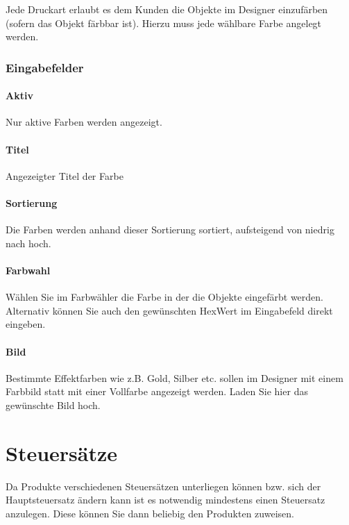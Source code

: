 \documentclass[letterpaper,10pt,ngerman]{sphinxmanual}
\begin{document}
Jede Druckart erlaubt es dem Kunden die Objekte im Designer einzufärben (sofern das Objekt färbbar ist).
Hierzu muss jede wählbare Farbe angelegt werden.


\subsubsection{Eingabefelder}
\label{\detokenize{hbe/printtypes:id1}}

\paragraph{Aktiv}
\label{\detokenize{hbe/printtypes:id2}}
Nur aktive Farben werden angezeigt.


\paragraph{Titel}
\label{\detokenize{hbe/printtypes:id3}}
Angezeigter Titel der Farbe


\paragraph{Sortierung}
\label{\detokenize{hbe/printtypes:id4}}
Die Farben werden anhand dieser Sortierung sortiert, aufsteigend von niedrig nach hoch.


\paragraph{Farbwahl}
\label{\detokenize{hbe/printtypes:farbwahl}}
Wählen Sie im Farbwähler die Farbe in der die Objekte eingefärbt werden. Alternativ können Sie auch den gewünschten
Hex\sphinxhyphen{}Wert im Eingabefeld direkt eingeben.


\paragraph{Bild}
\label{\detokenize{hbe/printtypes:bild}}
Bestimmte Effektfarben wie z.B. Gold, Silber etc. sollen im Designer mit einem Farbbild statt mit einer Vollfarbe
angezeigt werden. Laden Sie hier das gewünschte Bild hoch.


\section{Steuersätze}
\label{\detokenize{hbe/taxes:steuersatze}}\label{\detokenize{hbe/taxes::doc}}
Da Produkte verschiedenen Steuersätzen unterliegen können bzw. sich der Hauptsteuersatz ändern kann ist es notwendig
mindestens einen Steuersatz anzulegen. Diese können Sie dann beliebig den Produkten zuweisen.
\end{document}
